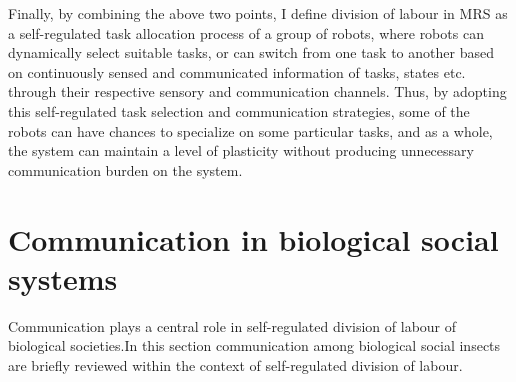 Finally, by combining the above two points, I define division of labour in MRS as a self-regulated task allocation process of a group of robots, where  robots can dynamically select suitable tasks, or can switch from one task to another based on  continuously sensed  and communicated information of tasks, states etc. through their respective sensory and communication  channels. Thus, by adopting this self-regulated task selection and communication strategies, some of the robots can have chances to specialize on some particular tasks, and as a whole, the system can maintain a level of plasticity without producing unnecessary communication burden on the system.
\section{Communication in biological social systems}
\label{bg:bio-comm}
Communication plays a central role in self-regulated division of labour of biological societies.In this section communication among biological social insects are briefly reviewed within the context of self-regulated  division of labour.

